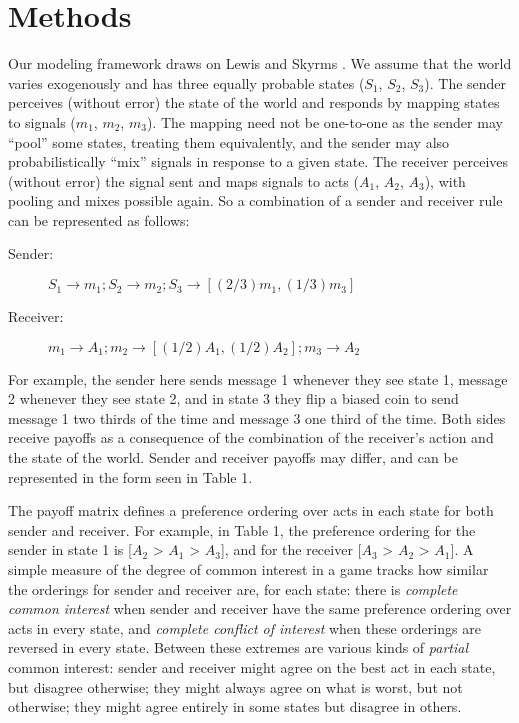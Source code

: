 \documentclass[10pt]{article}
\begin{document}
\section*{Methods}

Our modeling framework draws on Lewis \cite{Lewis1969} and Skyrms
\cite{Skyrms2010}. We assume that the world varies exogenously and has
three equally probable states ($S_{1}$, $S_{2}$,
$S_{3}$). The sender perceives (without error) the state of
the world and responds by mapping states to signals ($m_{1}$,
$m_{2}$, $m_{3}$). The mapping need not be
one-to-one as the sender may ``pool'' some states, treating them
equivalently, and the sender may also probabilistically ``mix'' signals
in response to a given state. The receiver perceives (without error) the
signal sent and maps signals to acts ($A_{1}$,
$A_{2}$, $A_{3}$), with pooling and mixes possible
again. So a combination of a sender and receiver rule can be represented
as follows:

\begin{description}
\item[Sender:]
$S_1\rightarrow m_1;S_2\rightarrow m_2;S_3\rightarrow \left[(2/3)m_1, (1/3)m_3\right]$
\item[Receiver:]
$m_1\rightarrow A_1; m_2\rightarrow \left[(1/2)A_1, (1/2)A_2\right]; m_3\rightarrow A_2$
\end{description}

For example, the sender here sends message 1 whenever they see state 1,
message 2 whenever they see state 2, and in state 3 they flip a biased
coin to send message 1 two thirds of the time and message 3 one third of
the time. Both sides receive payoffs as a consequence of the combination
of the receiver's action and the state of the world. Sender and receiver
payoffs may differ, and can be represented in the form seen in Table 1.

The payoff matrix defines a preference ordering over acts in each state
for both sender and receiver. For example, in Table 1, the preference
ordering for the sender in state 1 is {[}$A_{2}$
\textgreater{} $A_{1}$ \textgreater{} $A_{3}${]},
and for the receiver {[}$A_{3}$ \textgreater{}
$A_{2}$ \textgreater{} $A_{1}${]}. A simple
measure of the degree of common interest in a game tracks how similar
the orderings for sender and receiver are, for each state: there is
\emph{complete common interest} when sender and receiver have the same
preference ordering over acts in every state, and \emph{complete
conflict of interest} when these orderings are reversed in every state.
Between these extremes are various kinds of \emph{partial} common
interest: sender and receiver might agree on the best act in each state,
but disagree otherwise; they might always agree on what is worst, but
not otherwise; they might agree entirely in some states but disagree in
others.
\end{document}
